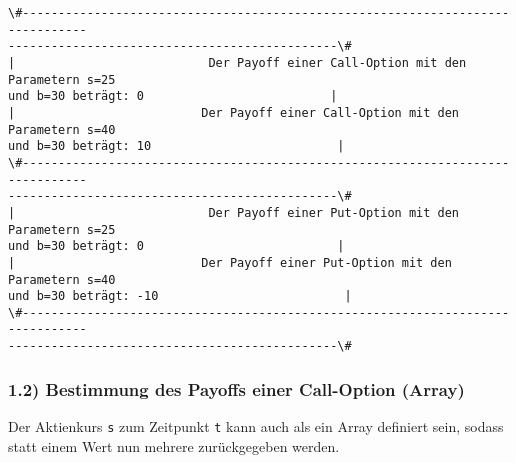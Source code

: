 \documentclass[paper=landscape]{scrartcl}
\begin{document}
    \begin{Verbatim}[commandchars=\\\{\}]
\#-------------------------------------------------------------------------------
----------------------------------------------\#
|                           Der Payoff einer Call-Option mit den Parametern s=25
und b=30 beträgt: 0                          |
|                          Der Payoff einer Call-Option mit den Parametern s=40
und b=30 beträgt: 10                          |
\#-------------------------------------------------------------------------------
----------------------------------------------\#
|                           Der Payoff einer Put-Option mit den Parametern s=25
und b=30 beträgt: 0                           |
|                          Der Payoff einer Put-Option mit den Parametern s=40
und b=30 beträgt: -10                          |
\#-------------------------------------------------------------------------------
----------------------------------------------\#
    \end{Verbatim}

    \hypertarget{bestimmung-des-payoffs-einer-call-option-array}{%
\subsubsection{1.2) Bestimmung des Payoffs einer Call-Option
(Array)}\label{bestimmung-des-payoffs-einer-call-option-array}}

Der Aktienkurs \texttt{s} zum Zeitpunkt \texttt{t} kann auch als ein
Array definiert sein, sodass statt einem Wert nun mehrere zurückgegeben
werden.
\end{document}
